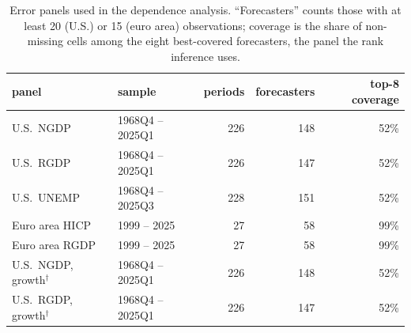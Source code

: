 \begin{table}[htb]
  \centering
  \caption[SPF error panels]{Error panels used in the dependence analysis. ``Forecasters'' counts those with at
  least 20 (U.S.) or 15 (euro area) observations; coverage is the share of non-missing cells among the eight
  best-covered forecasters, the panel the rank inference uses.}
  \label{tab:spf-dep-panels}
  \small
  \begin{tabular}{llrrr}
    \toprule
    panel & sample & periods & forecasters & top-8 coverage\\
    \midrule
    U.S.\ NGDP & 1968Q4 -- 2025Q1 & 226 & 148 & 52\%\\
    U.S.\ RGDP & 1968Q4 -- 2025Q1 & 226 & 147 & 52\%\\
    U.S.\ UNEMP & 1968Q4 -- 2025Q3 & 228 & 151 & 52\%\\
    Euro area HICP & 1999 -- 2025 & 27 & 58 & 99\%\\
    Euro area RGDP & 1999 -- 2025 & 27 & 58 & 99\%\\
    \midrule
    U.S.\ NGDP, growth$^\dagger$ & 1968Q4 -- 2025Q1 & 226 & 148 & 52\%\\
    U.S.\ RGDP, growth$^\dagger$ & 1968Q4 -- 2025Q1 & 226 & 147 & 52\%\\
    \bottomrule
  \end{tabular}
\end{table}
